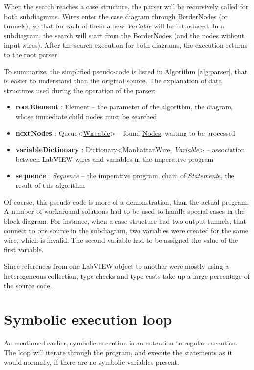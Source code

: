 When the search reaches a case structure, the parser will be recursively called for both subdiagrams. Wires enter the case diagram through \underline{BorderNode}s (or tunnels), so that for each of them a new \textit{Variable} will be introduced. In a subdiagram, the search will start from the \underline{BorderNode}s (and the nodes without input wires). After the search execution for both diagrams, the execution returns to the root parser.

To summarize, the simplified pseudo-code is listed in Algorithm \ref{alg:parser}, that is easier to understand than the original source. 
The explanation of data structures used during the operation of the parser:

\begin{itemize}
\item \textbf{rootElement} : \underline{Element} -- the parameter of the algorithm, the diagram, whose immediate child nodes must be searched
\item \textbf{nextNodes} : Queue<\underline{Wireable}> -- found \underline{Nodes}, waiting to be processed
\item \textbf{variableDictionary} : Dictionary<\underline{ManhattanWire}, \textit{Variable}> -- association between LabVIEW wires and variables in the imperative program
\item \textbf{sequence} : \textit{Sequence} -- the imperative program, chain of \textit{Statement}s, the result of this algorithm
\end{itemize}



Of course, this pseudo-code is more of a demonstration, than the actual program. A number of workaround solutions had to be used to handle special cases in the block diagram. For instance, when a case structure had two output tunnels, that connect to one source in the subdiagram, two variables were created for the same wire, which is invalid. The second variable had to be assigned the value of the first variable.

Since references from one LabVIEW object to another were mostly using a heterogeneous collection, type checks and type casts take up a large percentage of the source code.

\section{Symbolic execution loop}

As mentioned earlier, symbolic execution is an extension to regular execution. The loop will iterate through the program, and execute the statements as it would normally, if there are no symbolic variables present.

